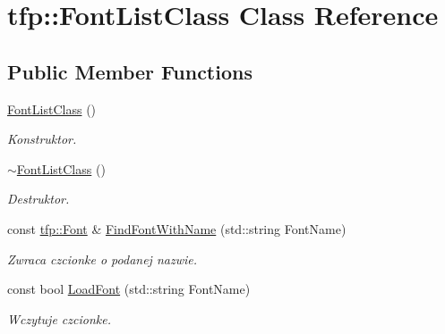 \hypertarget{classtfp_1_1_font_list_class}{}\section{tfp\+:\+:Font\+List\+Class Class Reference}
\label{classtfp_1_1_font_list_class}
\subsection*{Public Member Functions}
\begin{DoxyCompactItemize}
\item 
\mbox{\label{classtfp_1_1_font_list_class_a5d74138fdb0eaa2d1befc02e7875769d}} 
\mbox{\hyperlink{classtfp_1_1_font_list_class_a5d74138fdb0eaa2d1befc02e7875769d}{Font\+List\+Class}} ()
\begin{DoxyCompactList}\small\item\em Konstruktor. \end{DoxyCompactList}\item 
\mbox{\label{classtfp_1_1_font_list_class_a4c5d67e6794feff648b8a3eadf1ad13c}} 
\mbox{\hyperlink{classtfp_1_1_font_list_class_a4c5d67e6794feff648b8a3eadf1ad13c}{$\sim$\+Font\+List\+Class}} ()
\begin{DoxyCompactList}\small\item\em Destruktor. \end{DoxyCompactList}\item 
\mbox{\label{classtfp_1_1_font_list_class_a25091f2e31d9b64b66ce8fe4e75f410a}} 
const \mbox{\hyperlink{structtfp_1_1_font}{tfp\+::\+Font}} \& \mbox{\hyperlink{classtfp_1_1_font_list_class_a25091f2e31d9b64b66ce8fe4e75f410a}{Find\+Font\+With\+Name}} (std\+::string Font\+Name)
\begin{DoxyCompactList}\small\item\em Zwraca czcionke o podanej nazwie. \end{DoxyCompactList}\item 
\mbox{\label{classtfp_1_1_font_list_class_a27e095986544760464e5990e4a0f5dae}} 
const bool \mbox{\hyperlink{classtfp_1_1_font_list_class_a27e095986544760464e5990e4a0f5dae}{Load\+Font}} (std\+::string Font\+Name)
\begin{DoxyCompactList}\small\item\em Wczytuje czcionke. \end{DoxyCompactList}\item 

\end{DoxyCompactItemize}
